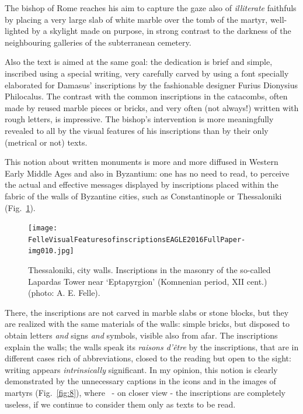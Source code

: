 \documentclass[amsthm,ebook]{saparticle}
\begin{document}
The bishop of Rome reaches his aim to capture the gaze also of \emph{illiterate} faithfuls by placing a very large slab of
white marble over the tomb of the martyr, well-lighted by a skylight made on purpose, in strong contrast to the
darkness of the neighbouring galleries of the subterranean cemetery. 

Also the text is aimed at the same goal: the dedication is brief and simple, inscribed using a special writing, very
carefully carved by using a font specially elaborated for Damasus' inscriptions by the fashionable designer Furius
Dionysius Philocalus. The contrast with the common inscriptions in the catacombs, often made by reused marble pieces or
bricks, and very often (not always!) written with rough letters, is impressive. The bishop's intervention is more
meaningfully revealed to all by the visual features of his inscriptions than by their only (metrical or not) texts. 

This notion about written monuments is more and more diffused in Western Early Middle Ages and also in Byzantium: one
has no need to read, to perceive the actual and effective messages displayed by inscriptions placed within the fabric
of the walls of Byzantine cities, such as Constantinople or Thessaloniki (Fig.~\ref{fig:7}).

\begin{figure}[!hbp]
\centering
 \texttt{[image: FelleVisualFeaturesofinscriptionsEAGLE2016FullPaper-img010.jpg]}
\caption{Thessaloniki, city walls. Inscriptions in the masonry of the so-called Lapardas Tower near `Eptapyrgion' (Komnenian period, XII cent.) (photo: A. E. Felle).}
\label{fig:7}
\end{figure}







There, the inscriptions are not carved in marble slabs or stone blocks, but they are realized with the same materials of
the walls: simple bricks, but disposed to obtain letters \emph{and} signs \emph{and} symbols, visible also from afar. The
inscriptions explain the walls; the walls speak its \emph{raisons d'être} by the inscriptions, that are in different cases
rich of abbreviations, closed to the reading but open to the sight: writing appears \emph{intrinsically} significant. In my
opinion, this notion is clearly demonstrated by the unnecessary captions in the icons and in the images of martyrs
(Fig.~\ref{fig:8}), where \ {}- on closer view - the inscriptions are completely useless, if we continue to consider them only as
texts to be read. 
\end{document}
